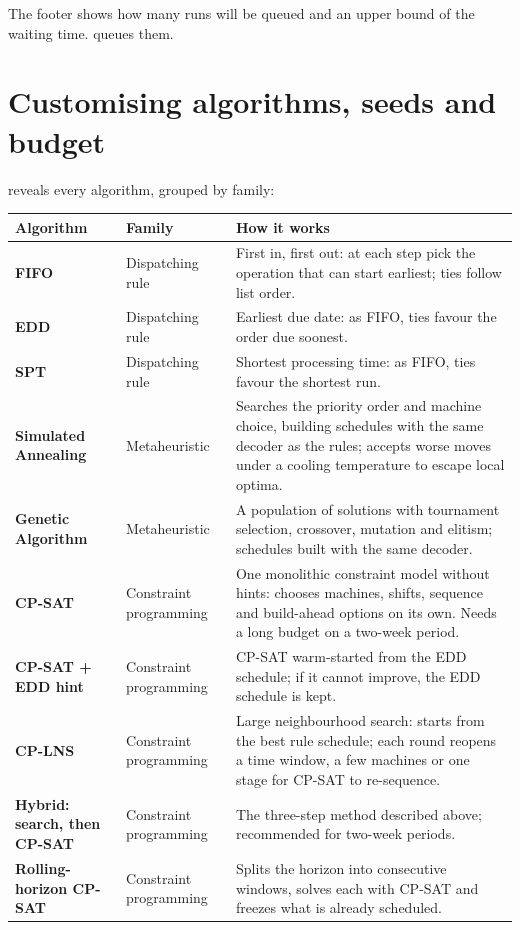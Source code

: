 The footer shows how many runs will be queued and an upper bound of the waiting time.  queues them.

\section{Customising algorithms, seeds and budget}

 reveals every algorithm, grouped by family:


\begin{longtable}{>{\bfseries}p{3.5cm}p{2.4cm}p{8.6cm}}
\toprule
\rowcolor{white}Algorithm & Family & How it works \\
\midrule
\endhead
FIFO & Dispatching rule & First in, first out: at each step pick the operation that can start earliest; ties follow list order. \\
EDD & Dispatching rule & Earliest due date: as FIFO, ties favour the order due soonest. \\
SPT & Dispatching rule & Shortest processing time: as FIFO, ties favour the shortest run. \\
Simulated Annealing & Metaheuristic & Searches the priority order and machine choice, building schedules with the same decoder as the rules; accepts worse moves under a cooling temperature to escape local optima. \\
Genetic Algorithm & Metaheuristic & A population of solutions with tournament selection, crossover, mutation and elitism; schedules built with the same decoder. \\
CP-SAT & Constraint programming & One monolithic constraint model without hints: chooses machines, shifts, sequence and build-ahead options on its own. Needs a long budget on a two-week period. \\
CP-SAT + EDD hint & Constraint programming & CP-SAT warm-started from the EDD schedule; if it cannot improve, the EDD schedule is kept. \\
CP-LNS & Constraint programming & Large neighbourhood search: starts from the best rule schedule; each round reopens a time window, a few machines or one stage for CP-SAT to re-sequence. \\
Hybrid: search, then CP-SAT & Constraint programming & The three-step method described above; recommended for two-week periods. \\
Rolling-horizon CP-SAT & Constraint programming & Splits the horizon into consecutive windows, solves each with CP-SAT and freezes what is already scheduled. \\
\bottomrule
\end{longtable}

